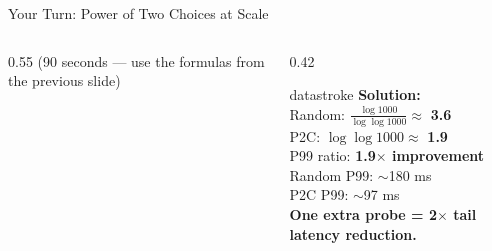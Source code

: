 \documentclass[aspectratio=169, 12pt]{beamer}
\begin{document}
\begin{frame}{Your Turn: Power of Two Choices at Scale}
\begin{columns}[T]
\begin{column}{0.55\textwidth}
    {\footnotesize\textcolor{midgray}{(90 seconds --- use the formulas from the previous slide)}}
  \end{column}
  \begin{column}{0.42\textwidth}
    \pause
    \begin{mlsyscard}{datastroke}
    \textbf{Solution:}\\[0.1cm]
    {\footnotesize
    Random: $\frac{\log 1000}{\log\log 1000} \approx$ \textbf{3.6}\\
    P2C: $\log\log 1000 \approx$ \textbf{1.9}\\[0.05cm]
    P99 ratio: \textbf{1.9$\times$ improvement}\\[0.1cm]
    Random P99: $\sim$180 ms\\
    P2C P99: $\sim$97 ms\\[0.05cm]
    \textcolor{datastroke}{\textbf{One extra probe = 2$\times$ tail latency reduction.}}
    }
    \end{mlsyscard}
  \end{column}
\end{columns}

\end{frame}
\end{document}
